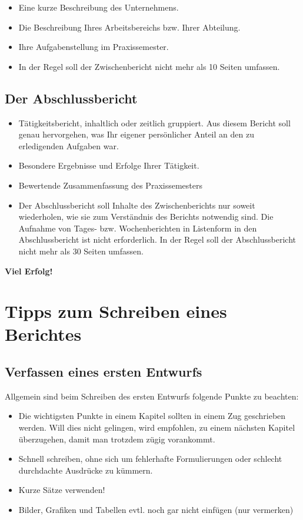 \documentclass[
  letterpaper,
  DIV=11]{scrartcl}
\begin{document}
\begin{itemize}
\item
  Eine kurze Beschreibung des Unternehmens.
\item
  Die Beschreibung Ihres Arbeitsbereichs bzw. Ihrer Abteilung.
\item
  Ihre Aufgabenstellung im Praxissemester.
\item
  In der Regel soll der Zwischenbericht nicht mehr als 10 Seiten
  umfassen.
\end{itemize}

\subsection{Der Abschlussbericht}\label{der-abschlussbericht}

\begin{itemize}
\item
  Tätigkeitsbericht, inhaltlich oder zeitlich gruppiert. Aus diesem
  Bericht soll genau hervorgehen, was Ihr eigener persönlicher Anteil an
  den zu erledigenden Aufgaben war.
\item
  Besondere Ergebnisse und Erfolge Ihrer Tätigkeit.
\item
  Bewertende Zusammenfassung des Praxissemesters
\item
  Der Abschlussbericht soll Inhalte des Zwischenberichts nur soweit
  wiederholen, wie sie zum Verständnis des Berichts notwendig sind. Die
  Aufnahme von Tages- bzw. Wochenberichten in Listenform in den
  Abschlussbericht ist nicht erforderlich. In der Regel soll der
  Abschlussbericht nicht mehr als 30 Seiten umfassen.
\end{itemize}

\textbf{Viel Erfolg!}

\section{Tipps zum Schreiben eines
Berichtes}\label{tipps-zum-schreiben-eines-berichtes}

\subsection{Verfassen eines ersten
Entwurfs}\label{verfassen-eines-ersten-entwurfs}

Allgemein sind beim Schreiben des ersten Entwurfs folgende Punkte zu
beachten:

\begin{itemize}
\item
  Die wichtigsten Punkte in einem Kapitel sollten in einem Zug
  geschrieben werden. Will dies nicht gelingen, wird empfohlen, zu einem
  nächsten Kapitel überzugehen, damit man trotzdem zügig vorankommt.
\item
  Schnell schreiben, ohne sich um fehlerhafte Formulierungen oder
  schlecht durchdachte Ausdrücke zu kümmern.
\item
  Kurze Sätze verwenden!
\item
  Bilder, Grafiken und Tabellen evtl. noch gar nicht einfügen (nur
  vermerken)
\end{itemize}
\end{document}
